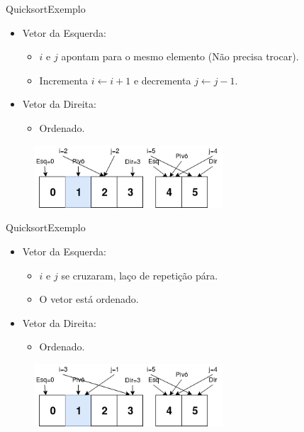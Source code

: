 \documentclass[aspectratio=169]{beamer}
\begin{document}

\begin{frame}{Quicksort}{Exemplo}
\begin{itemize}
 \item Vetor da Esquerda:
\begin{itemize}
 \item $i$ e $j$ apontam para o mesmo elemento (Não precisa trocar).
 \item Incrementa $i\leftarrow i + 1$ e decrementa $j \leftarrow j - 1$.
\end{itemize}
\item Vetor da Direita:
\begin{itemize}
\item Ordenado.
\end{itemize}
\end{itemize}

\begin{figure}[!h]
  \centering
  \includegraphics[width=200pt]{imgs/quick/quick27.png}
  \label{fig_quick27}
\end{figure}

\end{frame}


\begin{frame}{Quicksort}{Exemplo}
\begin{itemize}
 \item Vetor da Esquerda:
\begin{itemize}
 \item $i$ e $j$ se cruzaram, laço de repetição pára.
 \item O vetor está ordenado.
\end{itemize}
\item Vetor da Direita:
\begin{itemize}
\item Ordenado.
\end{itemize}
\end{itemize}


\begin{figure}[!h]
  \centering
  \includegraphics[width=200pt]{imgs/quick/quick28.png}
  \label{fig_quick28}
\end{figure}

\end{frame}
\end{document}
